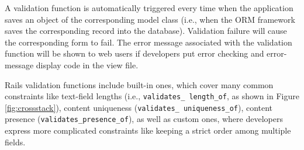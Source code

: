 A validation function is automatically triggered every time when the application saves an object of the corresponding model class (i.e., when the ORM framework saves the corresponding record into the database).
Validation failure will cause the corresponding form to fail. The error message associated with the validation function will be shown to web users if developers put error checking and error-message display code in the view file.

 
Rails validation
functions include built-in ones, which cover many common constraints like text-field lengths (i.e., {\tt validates\_ length\_of}, as shown in Figure \ref{fig:crossstack}),
content uniqueness ({\tt validates\_ uniqueness\_of}), 
content presence ({\tt validates\_presence\_of}),
as well as custom ones, where developers express more complicated constraints like keeping a strict order among multiple fields.

